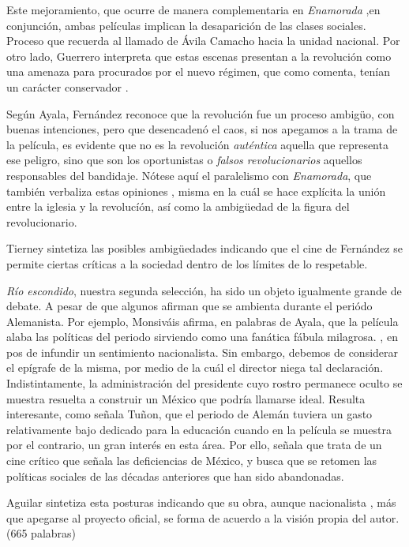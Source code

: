 Este mejoramiento, que ocurre de manera complementaria en \emph{Enamorada}\autocite[377]{sanchez_vi._2010}
,en conjunción, ambas películas implican la desaparición de las clases sociales\autocite[365]{sanchez_vi._2010}.
Proceso que recuerda al llamado de Ávila Camacho hacia la unidad nacional\autocite[366]{sanchez_vi._2010}.
Por otro lado, Guerrero interpreta que estas escenas presentan a la revolución como una amenaza\autocite[178]{guerrero_imagen_2005}
para procurados por el nuevo régimen,
que como comenta, tenían un carácter conservador\autocite[178]{guerrero_imagen_2005}
.

Según Ayala, Fernández reconoce que la revolución fue un proceso ambigüo, con buenas intenciones, pero que desencadenó el caos\autocite[36]{blanco_aventura_1993}, 
si nos apegamos a la trama de la película, es evidente que no es la revolución \emph{auténtica} aquella que representa ese peligro, sino que son los oportunistas o \emph{falsos revolucionarios} aquellos responsables del bandidaje.\autocite[48:07-48:40]{fernandez_flor_1943}
Nótese aquí el paralelismo con \emph{Enamorada}, que también verbaliza estas opiniones\autocite[14:11]{fernandez_enamorada_1946}\autocite[5:31]{fernandez_enamorada_1946}
, misma en la cuál se hace explícita la unión entre la iglesia y la revolucíón\autocite[377]{sanchez_vi._2010}, así como la ambigüedad de la figura del revolucionario\autocite[39:00]{fernandez_enamorada_1946}.

Tierney sintetiza  las posibles ambigüedades indicando que el cine de Fernández se permite ciertas críticas a la sociedad dentro de los límites de lo respetable\autocite[48]{tierney_myths_2002}.


\emph{Río escondido}, nuestra segunda selección, ha sido un objeto igualmente grande de debate\autocite[144]{garcia_riera_historia_1993}.
A pesar de que algunos afirman que se ambienta durante el periódo Alemanista\autocite[168]{mora_mexican_1978-2}.
Por ejemplo, Monsiváis afirma, en palabras de Ayala, que la película alaba las políticas del periodo sirviendo como una fanática fábula milagrosa\autocite[78]{blanco_aventura_1993}.
, en pos de infundir un sentimiento nacionalista\autocite[66]{consuelo_rangel_ley_2006}.
Sin embargo, debemos de considerar el epígrafe de la misma, por medio de la cuál el director niega tal declaración.\autocite[00:00]{fernandez_rio_1947}
Indistintamente, la administración del presidente cuyo rostro permanece oculto\autocite[12:15-12:40]{fernandez_rio_1947}
se muestra resuelta a construir un México que podría llamarse ideal\autocite[12:51]{fernandez_rio_1947}.
Resulta interesante, como señala Tuñon, que el periodo de Alemán tuviera un gasto relativamente bajo dedicado para la educación\autocite[451]{pablos_escuela_1998-1}
cuando en la película se muestra por el contrario, un gran interés en esta área\autocite[12:27]{fernandez_rio_1947}.
Por ello, señala que trata de un cine crítico que señala las deficiencias de México, y busca que se retomen las políticas sociales de las décadas anteriores\autocite[466]{pablos_escuela_1998-1}
que han sido abandonadas\autocite[62]{consuelo_rangel_ley_2006}.

Aguilar sintetiza esta posturas indicando que su obra, aunque nacionalista\autocite[127]{aguilar_construccion_2014-1}
, más que apegarse al proyecto oficial, se forma de acuerdo a la visión propia del autor\autocite[158]{aguilar_construccion_2014-1}.
(665 palabras)
\pagebreak
